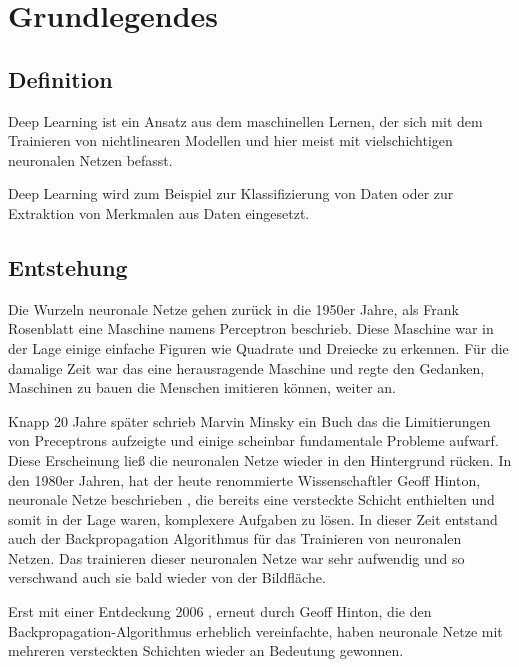 \chapter{Grundlegendes}
\label{cha:grundlegendes}

\section{Definition}

Deep Learning ist ein Ansatz aus dem maschinellen Lernen, der sich mit dem Trainieren von nichtlinearen Modellen und hier meist mit vielschichtigen neuronalen Netzen befasst. 

Deep Learning wird zum Beispiel zur Klassifizierung von Daten oder zur Extraktion von Merkmalen aus Daten eingesetzt.

\section{Entstehung}
\label{cha:entstehung}

Die Wurzeln neuronale Netze gehen zurück in die 1950er Jahre, als Frank Rosenblatt eine Maschine namens Perceptron \citep{Perceptron} beschrieb. Diese Maschine war in der Lage einige einfache Figuren wie Quadrate und Dreiecke zu erkennen. Für die damalige Zeit war das eine herausragende Maschine und regte den Gedanken, Maschinen zu bauen die Menschen imitieren können, weiter an.

Knapp 20 Jahre später schrieb Marvin Minsky \citep{PerceptronsMinsky} ein Buch das die Limitierungen von Preceptrons aufzeigte und einige scheinbar fundamentale Probleme aufwarf. Diese Erscheinung ließ die neuronalen Netze wieder in den Hintergrund rücken.
In den 1980er Jahren, hat der heute renommierte Wissenschaftler Geoff Hinton, neuronale Netze beschrieben \citep{BackpropagationEarly}, die bereits eine versteckte Schicht enthielten und somit in der Lage waren, komplexere Aufgaben zu lösen. In dieser Zeit entstand auch der Backpropagation Algorithmus für das Trainieren von neuronalen Netzen. %
Das trainieren dieser neuronalen Netze war sehr aufwendig und so verschwand auch sie bald wieder von der Bildfläche. 

Erst mit einer Entdeckung 2006 \citep{BackpropagationFast}, erneut durch Geoff Hinton, die den Backpropagation-Algorithmus erheblich vereinfachte, haben neuronale Netze mit mehreren versteckten Schichten wieder an Bedeutung gewonnen. 

